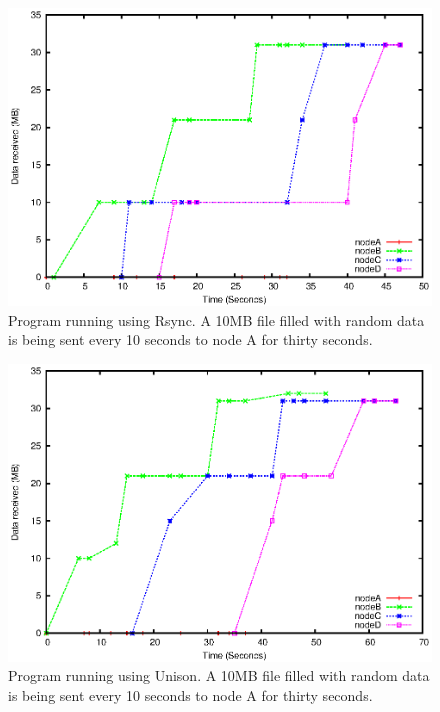 \documentclass[12pt]{article}
\begin{document}
\begin{figure}[ht!]
    \centering
    \includegraphics[height=0.4\textheight]{images/line-rsync-10-fixes.eps}
    \caption{Program running using Rsync. A 10MB file filled with random
    data is being sent every 10 seconds to node A for thirty seconds.}
    \label{fig:line_rsync}
\end{figure}

\begin{figure}[hb!]
    \centering
    \includegraphics[height=0.4\textheight]{images/line-uni-10-fixes.eps}
    \caption{Program running using Unison. A 10MB file filled with random
    data is being sent every 10 seconds to node A for thirty seconds.}
    \label{fig:line_uni}
\end{figure}
\pagebreak
\end{document}
